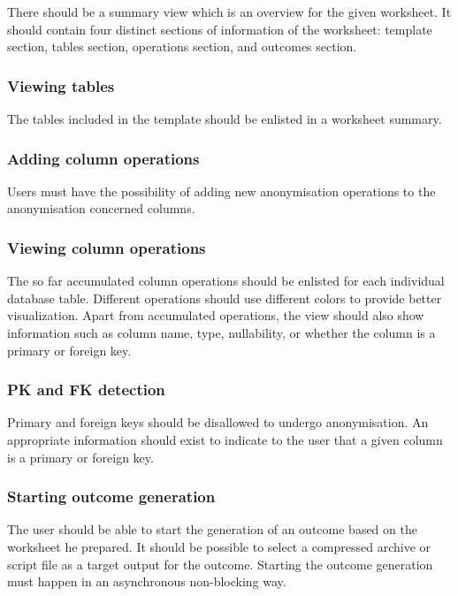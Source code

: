 \documentclass[a4paper,twoside,12pt]{book}
\begin{document}
There should be a summary view which is an overview for the given worksheet. It should contain four distinct sections of information of the worksheet: template section, tables section, operations section, and outcomes section.

\subsubsection{Viewing tables}

The tables included in the template should be enlisted in a worksheet summary.

\subsubsection{Adding column operations}

Users must have the possibility of adding new anonymisation operations to the anonymisation concerned columns.

\subsubsection{Viewing column operations}

The so far accumulated column operations should be enlisted for each individual database table. Different operations should use different colors to provide better visualization. Apart from accumulated operations, the view should also show information such as column name, type, nullability, or whether the column is a primary or foreign key.

\subsubsection{PK and FK detection}

Primary and foreign keys should be disallowed to undergo anonymisation. An appropriate information should exist to indicate to the user that a given column is a primary or foreign key.

\subsubsection{Starting outcome generation}

The user should be able to start the generation of an outcome based on the worksheet he prepared. It should be possible to select a compressed archive or script file as a target output for the outcome. Starting the outcome generation must happen in an asynchronous non-blocking way.
\end{document}
